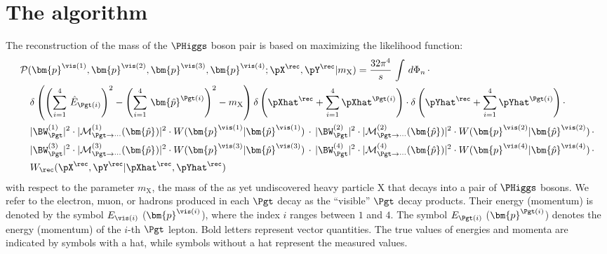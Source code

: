 \section{The algorithm}
\label{sec:algorithm}

The reconstruction of the mass of the $\PHiggs$ boson pair is based on maximizing the likelihood function:
\begin{align}
& \mathcal{P}(\bm{p}^{\vis(1)},\bm{p}^{\vis(2)},\bm{p}^{\vis(3)},\bm{p}^{\vis(4)};\pX^{\rec},\pY^{\rec}|m_{\textrm{X}})
= \frac{32\pi^{4}}{s} \, \int \, d\Phi_{n} \, \cdot \nonumber \\
& \quad \delta\left( \left(\sum_{i=1}^{4} \, \hat{E}_{\Pgt(i)}\right)^{2} - \left(\sum_{i=1}^{4} \, \bm{\hat{p}}^{\Pgt(i)}\right)^{2} - m_{\textrm{X}} \right) 
  \delta\left( \pXhat^{\rec} + \sum_{i=1}^{4} \pXhat^{\Pgt(i)} \right) \cdot \delta\left( \pYhat^{\rec} + \sum_{i=1}^{4} \pYhat^{\Pgt(i)} \right) \cdot \nonumber \\
& \quad \vert \BW^{(1)}_{\Pgt} \vert^{2} \cdot \vert \mathcal{M}^{(1)}_{\Pgt\to\cdots}(\bm{\hat{p}}) \vert^{2} \cdot W(\bm{p}^{\vis(1)}|\bm{\hat{p}}^{\vis(1)}) \, \cdot 
\, \vert \BW^{(2)}_{\Pgt} \vert^{2} \cdot \vert \mathcal{M}^{(2)}_{\Pgt\to\cdots}(\bm{\hat{p}}) \vert^{2} \cdot W(\bm{p}^{\vis(2)}|\bm{\hat{p}}^{\vis(2)}) \, \cdot \nonumber \\
& \quad \vert \BW^{(3)}_{\Pgt} \vert^{2} \cdot \vert \mathcal{M}^{(3)}_{\Pgt\to\cdots}(\bm{\hat{p}}) \vert^{2} \cdot W(\bm{p}^{\vis(3)}|\bm{\hat{p}}^{\vis(3)}) \, \cdot
\, \vert \BW^{(4)}_{\Pgt} \vert^{2} \cdot \vert \mathcal{M}^{(4)}_{\Pgt\to\cdots}(\bm{\hat{p}}) \vert^{2} \cdot W(\bm{p}^{\vis(4)}|\bm{\hat{p}}^{\vis(4)}) \, \cdot \nonumber \\
& \quad W_{\rec}( \pX^{\rec},\pY^{\rec} | \pXhat^{\rec},\pYhat^{\rec} ) 
\label{eq:likelihood}
\end{align}
with respect to the parameter $m_{\textrm{X}}$, 
the mass of the as yet undiscovered heavy particle $\textrm{X}$ that decays into a pair of $\PHiggs$ bosons.
We refer to the electron, muon, or hadrons produced in each $\Pgt$ decay as the ``visible'' $\Pgt$ decay products.
Their energy (momentum) is denoted by the symbol $E_{\vis(i)}$ ($\bm{p}^{\vis(i)}$), where the index $i$ ranges between $1$ and $4$.
The symbol $E_{\Pgt(i)}$ ($\bm{p}^{\Pgt(i)}$) denotes the energy (momentum) of the $i$-th $\Pgt$ lepton.
Bold letters represent vector quantities.
The true values of energies and momenta are indicated by symbols with a hat,
while symbols without a hat represent the measured values.
